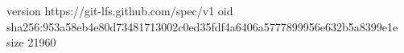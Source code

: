 version https://git-lfs.github.com/spec/v1
oid sha256:953a58eb4e80d73481713002c0ed35fdf4a6406a5777899956e632b5a8399e1e
size 21960
